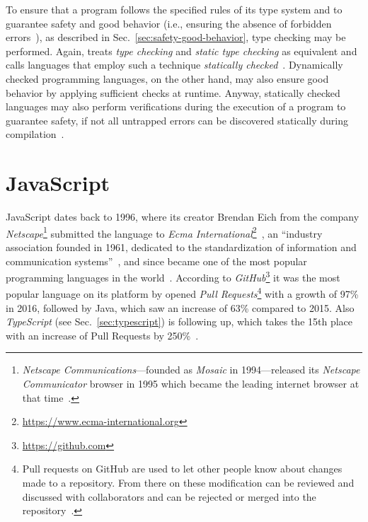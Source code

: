 To ensure that a program follows the specified rules of its type system and to guarantee safety and good behavior (i.e., ensuring the absence of forbidden errors~\cite[p.~97-37]{TypeSystems:Cardelli:2004}), as described in Sec.~\ref{sec:safety-good-behavior}, type checking may be performed. Again, \citeauthor{TypeSystems:Cardelli:2004} treats \emph{type checking} and \emph{static type checking} as equivalent and calls languages that employ such a technique \emph{statically checked}~\cite[p.~97-3]{TypeSystems:Cardelli:2004}. Dynamically checked programming languages, on the other hand, may also ensure good behavior by applying sufficient checks at runtime. Anyway, statically checked languages may also perform verifications during the execution of a program to guarantee safety, if not all untrapped errors can be discovered statically during compilation~\cite[p.~97-4]{TypeSystems:Cardelli:2004}.

\section{JavaScript}
\label{sec:javascript}

JavaScript dates back to 1996, where its creator Brendan Eich from the company \emph{Netscape}\footnote{\emph{Netscape Communications}---founded as \emph{Mosaic} in 1994---released its \emph{Netscape Communicator} browser in 1995 which became the leading internet browser at that time~\cite{HistoryOfNetscape:Cooper:2014}.} submitted the language to \emph{Ecma International}\footnote{\url{https://www.ecma-international.org}}~\cite[p.~28]{ProJavaScriptDevelopment:Odell:2014}, an ``industry association founded in 1961, dedicated to the standardization of information and communication systems''~\cite{EcmaInternational:Ecma}, and since became one of the most popular programming languages in the world~\cite[p.~2]{JavaScriptTheGoodParts:Crockford:2008}. According to \emph{GitHub}\footnote{\url{https://github.com}} it was the most popular language on its platform by opened \emph{Pull Requests}\footnote{Pull requests on GitHub are used to let other people know about changes made to a repository. From there on these modification can be reviewed and discussed with collaborators and can be rejected or merged into the repository~\cite{GitHubPullRequest:GitHub:2014}.} with a growth of 97\% in 2016, followed by Java, which saw an increase of 63\% compared to 2015. Also \emph{TypeScript} (see Sec.~\ref{sec:typescript}) is following up, which takes the 15th place with an increase of Pull Requests by 250\%~\cite{GitHubOctoverse2016:GitHub:2016}.

